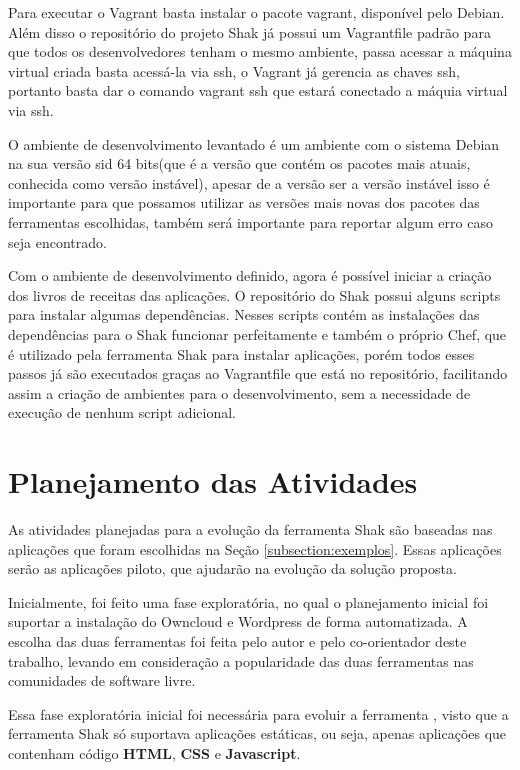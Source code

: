 Para executar o Vagrant basta instalar o pacote vagrant, disponível pelo Debian. Além disso
o repositório do projeto Shak já possui um Vagrantfile padrão para que todos os
desenvolvedores tenham o mesmo ambiente, passa acessar a máquina virtual criada
basta acessá-la via ssh, o Vagrant já gerencia as chaves ssh, portanto basta
dar o comando vagrant ssh que estará conectado a máquia virtual via ssh.

O ambiente de desenvolvimento levantado é um ambiente com o sistema Debian na sua versão
sid 64 bits(que é a versão que contém os pacotes mais atuais, conhecida como versão instável),
apesar de a versão ser a versão instável isso é importante para que possamos
utilizar as versões mais novas dos pacotes das ferramentas escolhidas, também
será importante para reportar algum erro caso seja encontrado.

Com o ambiente de desenvolvimento definido, agora é possível iniciar a criação dos
livros de receitas das aplicações. O repositório do Shak possui alguns scripts
para instalar algumas dependências. Nesses scripts contém as instalações das 
dependências para o Shak funcionar perfeitamente
e também o próprio Chef, que é utilizado pela ferramenta Shak para instalar aplicações, 
porém todos esses passos já são executados graças ao Vagrantfile
que está no repositório, facilitando assim a criação de ambientes para o desenvolvimento,
sem a necessidade de execução de nenhum script adicional.


\section{Planejamento das Atividades}

As atividades planejadas para a evolução da ferramenta Shak são baseadas nas 
aplicações que foram escolhidas na Seção
\ref{subsection:exemplos}. Essas aplicações serão as aplicações piloto, que 
ajudarão na evolução da solução proposta. 

Inicialmente, foi feito uma fase exploratória, no qual o planejamento inicial foi
suportar a instalação do Owncloud e Wordpress de forma 
automatizada. A escolha das duas ferramentas foi feita pelo autor e pelo co-orientador
deste trabalho, levando em consideração a popularidade das duas ferramentas nas 
comunidades de software livre. 

Essa fase exploratória inicial foi necessária para evoluir a ferramenta
, visto que a ferramenta Shak só suportava aplicações estáticas, ou seja, apenas 
aplicações que contenham 
código \textbf{HTML}, \textbf{CSS} e \textbf{Javascript}. 

